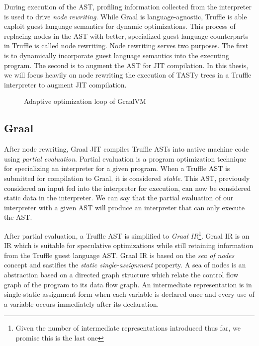 During execution of the AST, profiling information collected from the interpreter is used to drive \textit{node rewriting}.
While Graal is language-agnostic, Truffle is able exploit guest language semantics for dynamic optimizations.
This process of replacing nodes in the AST with better, specialized guest language counterparts in Truffle is called node rewriting.
Node rewriting serves two purposes.
The first is to dynamically incorporate guest language semantics into the executing program.
The second is to augment the AST for JIT compilation. 
In this thesis, we will focus heavily on node rewriting the execution of TASTy trees in a Truffle interpreter to augment JIT compilation.

\begin{figure}[!htb]
	\centering
	\caption{Adaptive optimization loop of GraalVM}
\end{figure}

\subsection{Graal}

After node rewriting, Graal JIT compiles Truffle ASTs into native machine code using \textit{partial evaluation}.
Partial evaluation is a program optimization technique for specializing an interpreter for a given program\cite{futamura:partial-eval}.
When a Truffle AST is submitted for compilation to Graal, it is considered \textit{stable}.
This AST, previously considered an input fed into the interpreter for execution, can now be considered static data in the interpreter.
We can say that the partial evaluation of our interpreter with a given AST will produce an interpreter that can only execute the AST.

After partial evaluation, a Truffle AST is simplified to \textit{Graal IR}\cite{graalvm:ir}\footnote{Given the number of intermediate representations introduced thus far, we promise this is the last one}.
Graal IR is an IR which is suitable for speculative optimizations while still retaining information from the Truffle guest language AST.
Graal IR is based on the \textit{sea of nodes} concept\cite{click:sea-of-nodes} and sastifies the \textit{static single-assignment}\cite{ssa} property.
A sea of nodes is an abstraction based on a directed graph structure which relate the control flow graph\cite{allen:ctrl-flow-analysis} of the program to its data flow graph\cite{allen:data-flow-analysis}.
An intermediate representation is in single-static assignment form when each variable is declared once and every use of a variable occurs immediately after its declaration\cite{johnson:use-def-chains}.


